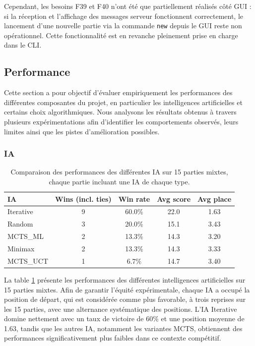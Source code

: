 \documentclass[11pt]{article}
\begin{document}
Cependant, les besoins F39 et F40 n'ont été que partiellement réalisés 
côté GUI : si la réception et l'affichage des messages serveur 
fonctionnent correctement, le lancement d'une nouvelle partie via la 
commande \texttt{new} depuis le GUI reste non opérationnel. Cette 
fonctionnalité est en revanche pleinement prise en charge dans le CLI.

\subsection{Performance}

Cette section a pour objectif d’évaluer empiriquement les performances des différentes composantes du projet, en particulier les intelligences artificielles et certains choix algorithmiques.
Nous analysons les résultats obtenus à travers plusieurs expérimentations afin d’identifier les comportements observés, leurs limites ainsi que les pistes d’amélioration possibles.

\subsubsection{IA}
\label{subsubsec:iaperfo}

\begin{table}[H]
\centering
\begin{tabular}{lcccc}
\hline
\textbf{IA} & \textbf{Wins (incl. ties)} & \textbf{Win rate} & 
\textbf{Avg score} & \textbf{Avg place} \\
\hline
Iterative  & 9 & 60.0\% & 22.0 & 1.63 \\
Random     & 3 & 20.0\% & 15.1 & 3.43 \\
MCTS\_ML   & 2 & 13.3\% & 14.3 & 3.20 \\
Minimax    & 2 & 13.3\% & 14.3 & 3.33 \\
MCTS\_UCT  & 1 &  6.7\% & 14.7 & 3.40 \\
\hline
\end{tabular}
\caption{Comparaison des performances des différentes IA sur 15 parties 
mixtes, chaque partie incluant une IA de chaque type.}
\label{ia_comparaison}
\end{table}

La table \ref{ia_comparaison} présente les performances des différentes intelligences 
artificielles sur 15 parties mixtes. Afin de garantir l’équité expérimentale, 
chaque IA a occupé la position de départ, qui est considérée comme plus favorable, à trois reprises sur les 15 parties, avec une alternance systématique des positions.
L'IA Iterative domine nettement 
avec un taux de victoire de 60\% et une position moyenne de 1.63, tandis 
que les autres IA, notamment les variantes MCTS, obtiennent des 
performances significativement plus faibles dans ce contexte compétitif.
\end{document}
